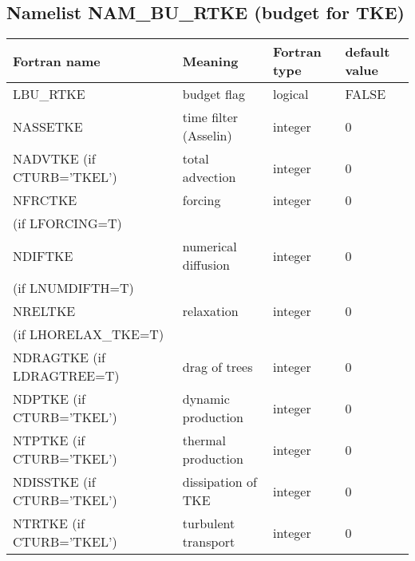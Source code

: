 \subsection{Namelist NAM\_BU\_RTKE (budget for TKE)}

\begin{longtable} {|p{}|p{}|>{\centering}p{}|p{}<{\centering}|}
\hline
Fortran name & Meaning & Fortran type & default value \\
\hline \hline
\endhead
LBU\_RTKE & budget flag & logical & FALSE\index{LBU\_RTKE!\innam{NAM\_BU\_RTKE}} \\\hline
NASSETKE  & time filter (Asselin)   & integer  &  0 \index{NASSETKE!\innam{NAM\_BU\_RTKE}} \\\hline
NADVTKE (if CTURB='TKEL') & total advection   & integer  &  0 \index{NADVTKE!\innam{NAM\_BU\_RTKE}}\\\hline
NFRCTKE   & forcing           & integer  &  0 \index{NFRCTKE!\innam{NAM\_BU\_RTKE}} \\ \nopagebreak
(if LFORCING=T) &  &   &   \\\hline
NDIFTKE   & numerical diffusion & integer  &  0 \index{NDIFTKE!\innam{NAM\_BU\_RTKE}}\\ \nopagebreak
(if LNUMDIFTH=T) &  &   &   \\\hline
NRELTKE   & relaxation        & integer  &  0 \index{NRELTKE!\innam{NAM\_BU\_RTKE}}\\ \nopagebreak
(if LHORELAX\_TKE=T) &  &   &   \\\hline
NDRAGTKE (if LDRAGTREE=T) & drag of trees & integer  &  0 \index{NDRAGTKE!\innam{NAM\_BU\_RTKE}} \\\hline
NDPTKE (if CTURB='TKEL') & dynamic production & integer  &  0 \index{NDPTKE!\innam{NAM\_BU\_RTKE}}\\\hline
NTPTKE (if CTURB='TKEL') & thermal production & integer  &  0 \index{NTPTKE!\innam{NAM\_BU\_RTKE}}\\\hline
NDISSTKE (if CTURB='TKEL') & dissipation of TKE & integer  &  0 \index{NDISSTKE!\innam{NAM\_BU\_RTKE}}\\\hline
NTRTKE (if CTURB='TKEL') & turbulent transport &  integer  &  0 \index{NTRTKE!\innam{NAM\_BU\_RTKE}} \\\hline
\end{longtable}

